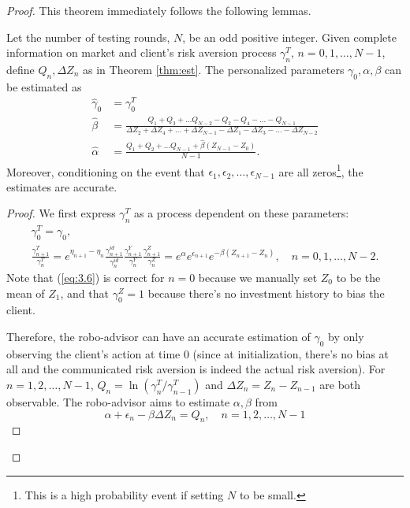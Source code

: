 \begin{proof}
    This theorem immediately follows the following lemmas.

    \begin{lemma}\label{lem:est_ab}
    Let the number of testing rounds, $N$, be an odd positive integer. Given complete information on market and client's risk aversion process $\gamma^T_n$, $n=0,1,\ldots,N-1$, define $Q_n,\Delta Z_n$ as in Theorem \ref{thm:est}. The personalized parameters $\gamma_0,\alpha,\beta$ can be estimated as \begin{align*}
        \hat\gamma_0&=\gamma_0^T\\
        \hat \beta&=\frac{Q_1+Q_3+\ldots Q_{N-2}-Q_2-Q_4-\ldots-Q_{N-1}}{\Delta Z_2+\Delta Z_4+\ldots+\Delta Z_{N-1}-\Delta Z_1-\Delta Z_3-\ldots-\Delta Z_{N-2}}\\
        \hat\alpha&=\frac{Q_1+Q_2+\ldots Q_{N-1}+\hat\beta(Z_{N-1}-Z_0)}{N-1}.
    \end{align*} Moreover, conditioning on the event that $\epsilon_1,\epsilon_2,\ldots,\epsilon_{N-1}$ are all zeros\footnote{This is a high probability event if setting $N$ to be small.}, the estimates are accurate.
\end{lemma}

\begin{proof}
We first express $\gamma_n^T$ as a process dependent on these parameters: \begin{gather}
    \gamma_0^T=\gamma_0,\\
    \frac{\gamma_{n+1}^T}{\gamma_{n}^T}=e^{\eta_{n+1}-\eta_{n}}\frac{\gamma_{n+1}^{id}}{\gamma_n^{id}}\frac{\gamma_{n+1}^Y}{\gamma_n^Y}\frac{\gamma_{n+1}^Z}{\gamma_n^Z}=e^\alpha e^{\epsilon_{n+1}} e^{-\beta(Z_{n+1}-Z_n)},\quad n=0,1,\ldots,N-2.\label{eq:3.6}
\end{gather}
Note that (\ref{eq:3.6}) is correct for $n=0$ because we manually set $Z_0$ to be the mean of $Z_1$, and that $\gamma_0^Z=1$ because there's no investment history to bias the client.

Therefore, the robo-advisor can have an accurate estimation of $\gamma_0$ by only observing the client's action at time $0$ (since at initialization, there's no bias at all and the communicated risk aversion is indeed the actual risk aversion). For $n=1,2,\ldots,N-1$, $Q_{n}=\ln(\gamma_{n}^T/\gamma_{n-1}^T)$ and $\Delta Z_n=Z_n-Z_{n-1}$ are both observable. The robo-advisor aims to estimate $\alpha,\beta$ from $$
\alpha+\epsilon_n-\beta\Delta Z_n=Q_n, \quad n=1,2,\ldots,N-1
$$


\end{proof}
\end{proof}
